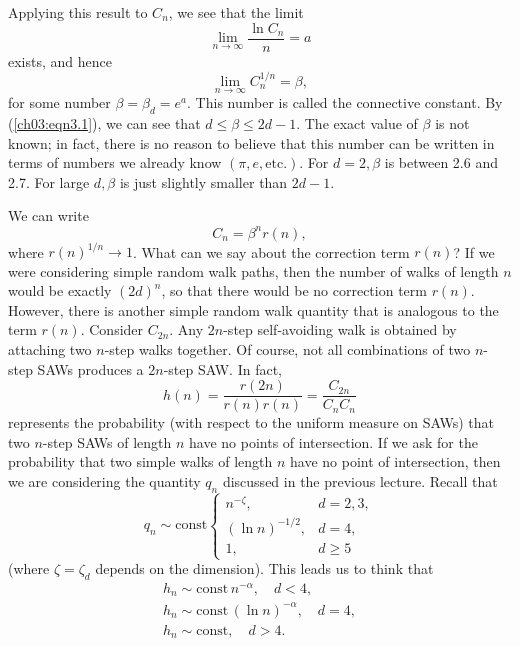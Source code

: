 \documentclass{stml-l}
\theoremstyle{definition}
\numberwithin{equation}{chapter}
\numberwithin{figure}{chapter}
\numberwithin{figure}{section}
\begin{document}
Applying this result to $C_{n}$, we see that the limit
\begin{equation*}
\lim\limits_{n\rightarrow\infty}\frac{\ln C_{n}}{n}=a
\end{equation*}
exists, and hence
\begin{equation*}
\lim_{n\rightarrow\infty}C_{n}^{1/n}=\beta,
\end{equation*}
for some number $\beta=\beta_{d}=e^{a}$. This number is called the
connective constant. By (\ref{ch03:eqn3.1}), we can see that
$d\leq\beta\leq 2d-1$. The exact value of $\beta$ is not known; in
fact, there is no reason to believe that this number can be written
in terms of numbers we already know $(\pi,e,\mathrm{etc}.)$. For
$d=2,\beta$ is between 2.6 and 2.7. For large $d,\beta$ is just
slightly smaller than $2d-1$.

We can write
\begin{equation*}
C_{n}=\beta^{n}r(n),
\end{equation*}
where $r(n)^{1/n}\rightarrow 1$. What can we say about the
correction term $r(n)$? If we were considering simple random walk
paths, then the number of walks of length $n$ would be exactly
$(2d)^{n}$, so that there would be no correction term $r(n)$.
However, there is another simple random walk quantity that is
analogous to the term $r(n)$. Consider $C_{2n}$. Any $2n$-step
self-avoiding walk is obtained by attaching two $n$-step walks
together. Of course, not all combinations of two $n$-step SAWs
produces a $2n$-step SAW. In fact,
\begin{equation*}
h(n)=\frac{r(2n)}{r(n)r(n)}=\frac{C_{2n}}{C_{n}C_{n}}
\end{equation*}
represents the probability (with respect to the uniform measure on
SAWs) that two $n$-step SAWs of length $n$ have no points of
intersection. If we ask for the probability that two simple walks of
length $n$ have no point of intersection, then we are considering
the quantity $q_{n}$ discussed in the previous lecture. Recall that
\begin{equation*}
q_{n}\sim \mathrm{const} \begin{cases}
n^{-\zeta}, & d=2,3,\\
(\ln n)^{-1/2}, & d=4,\\
1, & d\geq 5\end{cases}
\end{equation*}
(where $\zeta=\zeta_{d}$ depends on the dimension). This leads us to
think that
\begin{gather*}
h_{n}\sim \mathrm{const}\,n^{-\alpha},\quad d<4,\\
h_{n}\sim \mathrm{const}\,(\ln n)^{-\alpha},\quad d=4,\\
h_{n}\sim\mathrm{const},\quad d>4.
\end{gather*}
\end{document}
